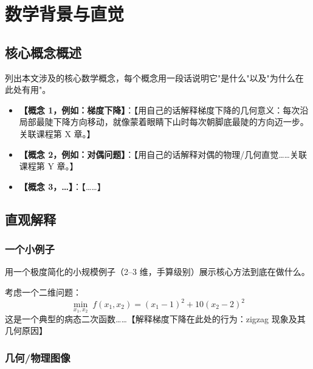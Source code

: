 \section{数学背景与直觉}


\subsection{核心概念概述}

列出本文涉及的核心数学概念，每个概念用一段话说明它"是什么"以及"为什么在此处有用"。

\begin{itemize}
    \item \textbf{【概念 1，例如：梯度下降】}：【用自己的话解释梯度下降的几何意义：每次沿局部最陡下降方向移动，就像蒙着眼睛下山时每次朝脚底最陡的方向迈一步。关联课程第 X 章。】
    \item \textbf{【概念 2，例如：对偶问题】}：【用自己的话解释对偶的物理/几何直觉……关联课程第 Y 章。】
    \item \textbf{【概念 3，…】}：【……】
\end{itemize}

\subsection{直观解释}

\subsubsection{一个小例子}

用一个极度简化的小规模例子（2--3 维，手算级别）展示核心方法到底在做什么。

\begin{example}
    考虑一个二维问题：
    \begin{equation}
        \min_{x_1, x_2} \; f(x_1, x_2) = (x_1 - 1)^2 + 10(x_2 - 2)^2
    \end{equation}
    这是一个典型的病态二次函数……【解释梯度下降在此处的行为：zigzag 现象及其几何原因】
\end{example}

\subsubsection{几何/物理图像}

